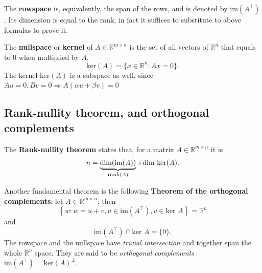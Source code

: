\documentclass[10pt]{report}
\begin{document}
The \textbf{rowspace} is, equivalently, the span of the rows, and is denoted by \(\mbox{im}(A^\top)\). Its dimension is equal to the rank, in fact it suffices to substitute to above formulas to prove it.

The \textbf{nullspace} or \textbf{kernel} of \(A\in\mathbb{R}^{m \times n}\) is the set of all vectors of \(\mathbb{R}^n\) that equals to \(0\) when multiplied by \(A\), $$\mbox{ker}(A) = \{x \in \mathbb{R}^n : Ax = 0\}.$$ The kernel \(\mbox{ker}(A)\) is a subspace as well, since \(Au = 0, Bv = 0 \Longrightarrow A(\alpha u + \beta v) = 0\)

\subsection{Rank\--nullity theorem, and orthogonal complements}
\label{sec:orgc96482f}
The \textbf{Rank\--nullity theorem} states that, for a matrix \(A\in\mathbb{R}^{m \times n}\) it is $$n = \underbrace{\mbox{dim}(\mbox{im}(A))}_{\mbox{\footnotesize rank}(A)} + \mbox{dim }{\mbox{ker}(A)}.$$

Another fundamental theorem is the following \textbf{Theorem of the orthogonal complements}: let \(A \in \mathbb{R}^{m \times n}\); then $$\left\{ w : w = u + v, u \in \mbox{im}(A^\top), v \in \mbox{ker }A \right\} = \mathbb{R}^n$$ and $$\mbox{im}(A^\top) \cap \mbox{ker }A = \{0\}.$$ The rowspace and the nullspace have \emph{trivial intersection} and together span the whole \(\mathbb{R}^n\) space. They are said to be \emph{orthogonal complements} \(\mbox{im}(A^\top) = \mbox{ker}(A)^\bot\).
\end{document}
